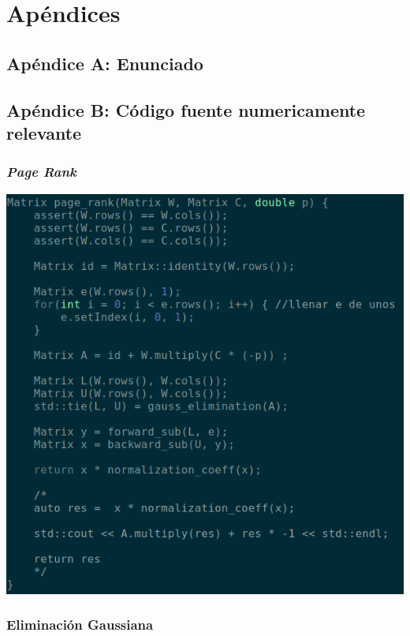 \section{Apéndices}

	\subsection{Apéndice A: Enunciado}
		

	\subsection{Apéndice B: Código fuente numericamente relevante}
	\clearpage

		\subsubsection{\textit{Page Rank}}

			\includegraphics[scale=0.75]{img/src/page_rank}


		\subsubsection{Eliminación Gaussiana}

